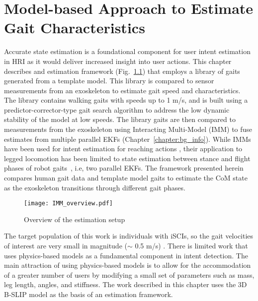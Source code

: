 \chapter{Model-based Approach to Estimate Gait Characteristics} \label{chapter:IMM}
Accurate state estimation is a foundational component for user intent estimation in HRI as it would deliver increased insight into user actions. This chapter describes and estimation framework (Fig.~\ref{fig:IMM_overview}) that employs a library of gaits generated from a template model. This library is compared to sensor measurements from an exoskeleton to estimate gait speed and characteristics. The library contains walking gaits with speeds up to 1 m/s, and is built using a predictor-corrector-type gait search algorithm to address the low dynamic stability of the model at low speeds. The library gaits are then compared to measurements from the exoskeleton using Interacting Multi-Model (IMM) to fuse estimates from multiple parallel EKFs (Chapter~\ref{chapter:bg_info}). While IMMs have been used for intent estimation for reaching actions \cite{chaandar2015human}, their application to legged locomotion has been limited to state estimation between stance and flight phases of robot gaits~\cite{skaff2005context, pace2020stepping}, i.e, two parallel EKFs. The framework presented herein compares human gait data and template model gaits to estimate the CoM state as the exoskeleton transitions through different gait phases.

\begin{figure}
	\centering
	\texttt{[image: IMM\_overview.pdf]}
	\caption{Overview of the estimation setup}\label{fig:IMM_overview}
	\vspace{-1em}
\end{figure}

The target population of this work is individuals with iSCIs, so the gait velocities of interest are very small in magnitude ($ \sim $ 0.5 m/s) \cite{nymark2005electromyographic}. There is limited work that uses physics-based models as a fundamental component in intent detection. The main attraction of using physics-based models is to allow for the accommodation of a greater number of users by modifying a small set of parameters such as mass, leg length, angles, and stiffness. The work described in this chapter uses the 3D B-SLIP model \cite{liu2015dynamic} as the basis of an estimation framework.

